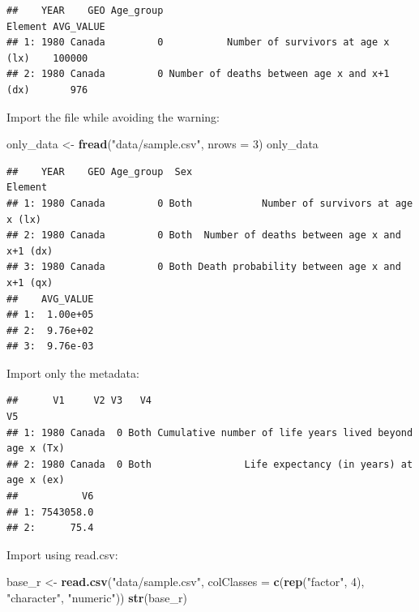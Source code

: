 \documentclass[]{book}
\newenvironment{Shaded}{\begin{snugshade}}{\end{snugshade}}
\newcommand{\DataTypeTok}[1]{\textcolor[rgb]{0.13,0.29,0.53}{#1}}
\newcommand{\DecValTok}[1]{\textcolor[rgb]{0.00,0.00,0.81}{#1}}
\newcommand{\KeywordTok}[1]{\textcolor[rgb]{0.13,0.29,0.53}{\textbf{#1}}}
\newcommand{\NormalTok}[1]{#1}
\newcommand{\OperatorTok}[1]{\textcolor[rgb]{0.81,0.36,0.00}{\textbf{#1}}}
\newcommand{\StringTok}[1]{\textcolor[rgb]{0.31,0.60,0.02}{#1}}
\begin{document}
\begin{verbatim}
##    YEAR    GEO Age_group                                     Element AVG_VALUE
## 1: 1980 Canada         0           Number of survivors at age x (lx)    100000
## 2: 1980 Canada         0 Number of deaths between age x and x+1 (dx)       976
\end{verbatim}

Import the file while avoiding the warning:

\begin{Shaded}
\begin{Highlighting}[]
\NormalTok{only_data <-}\StringTok{ }\KeywordTok{fread}\NormalTok{(}\StringTok{"data/sample.csv"}\NormalTok{, }\DataTypeTok{nrows =} \DecValTok{3}\NormalTok{)}
\NormalTok{only_data}
\end{Highlighting}
\end{Shaded}

\begin{verbatim}
##    YEAR    GEO Age_group  Sex                                      Element
## 1: 1980 Canada         0 Both            Number of survivors at age x (lx)
## 2: 1980 Canada         0 Both  Number of deaths between age x and x+1 (dx)
## 3: 1980 Canada         0 Both Death probability between age x and x+1 (qx)
##    AVG_VALUE
## 1:  1.00e+05
## 2:  9.76e+02
## 3:  9.76e-03
\end{verbatim}

Import only the metadata:

\begin{Shaded}
\end{Shaded}

\begin{verbatim}
##      V1     V2 V3   V4                                                      V5
## 1: 1980 Canada  0 Both Cumulative number of life years lived beyond age x (Tx)
## 2: 1980 Canada  0 Both                Life expectancy (in years) at age x (ex)
##           V6
## 1: 7543058.0
## 2:      75.4
\end{verbatim}

Import using read.csv:

\begin{Shaded}
\begin{Highlighting}[]
\NormalTok{base_r <-}\StringTok{ }\KeywordTok{read.csv}\NormalTok{(}\StringTok{"data/sample.csv"}\NormalTok{, }
                   \DataTypeTok{colClasses =} \KeywordTok{c}\NormalTok{(}\KeywordTok{rep}\NormalTok{(}\StringTok{"factor"}\NormalTok{, }\DecValTok{4}\NormalTok{), }
                                  \StringTok{"character"}\NormalTok{, }
                                  \StringTok{"numeric"}\NormalTok{))}
\KeywordTok{str}\NormalTok{(base_r)}
\end{Highlighting}
\end{Shaded}
\end{document}
